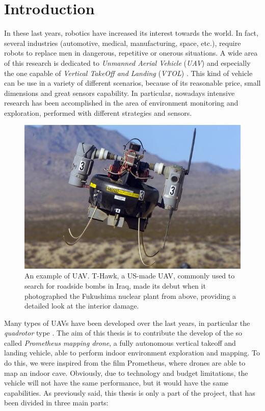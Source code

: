 \chapter{Introduction}
\label{introduction}

\renewcommand{\thepage}{\arabic{page}} 			%
\setcounter{page}{1}                   			%

In these last years, robotics have increased its interest towards the world. In fact, several industries (automotive, medical, manufacturing, space, etc.), require robots to replace men in dangerous, repetitive or onerous situations. A wide area of this research is dedicated to \textit{Unmanned Aerial Vehicle} (\textit{UAV}) and especially the one capable of \textit{Vertical TakeOff and Landing} (\textit{VTOL}) \cite{largeQuadrotor}. This kind of vehicle can be use in a variety of different scenarios, because of its reasonable price, small dimensions and great sensors capability. In particular, nowadays intensive research has been accomplished in the area of environment monitoring and exploration, performed with different strategies and sensors.

\begin{figure}
	\includegraphics[scale=0.4]{images/fukushima.jpg}
	\caption{An example of UAV. T-Hawk, a US-made UAV, commonly used to search for roadside bombs in Iraq, made its debut when it photographed the Fukushima nuclear plant from above, providing a detailed look at the interior damage.}
	\label{fig:application}
\end{figure}  

\noindent Many types of UAVs have been developed over the last years, in particular the \textit{quadrotor} type \cite{Aalborg}. The aim of this thesis is to contribute the develop of the so called \textit{Prometheus mapping drone}, a fully autonomous vertical takeoff and landing vehicle, able to perform indoor environment exploration and mapping. To do this, we were inspired from the film Prometheus, where drones are able to map an indoor cave. Obviously, due to technology and budget limitations, the vehicle will not have the same performance, but it would have the same capabilities. As previously said, this thesis is only a part of the project, that has been divided in three main parts:

